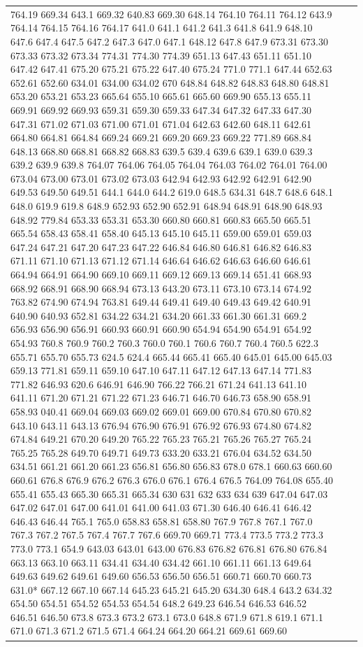 \documentclass[3p,super,numbers,sort&compress,preprint,10pt]{elsarticle}
\begin{document}
\begin{longtable}{|L{.1in}|L{.6in}||L{5.65in}|}
764.19 669.34 643.1 669.32 640.83 669.30 648.14 764.10 764.11 764.12 643.9 764.14 764.15 764.16 764.17 641.0 641.1 641.2 641.3 641.8 641.9 648.10 647.6 647.4 647.5 647.2 647.3 647.0 647.1 648.12 647.8 647.9 673.31 673.30 673.33 673.32 673.34 774.31 774.30 774.39 651.13 647.43 651.11 651.10 647.42 647.41 675.20 675.21 675.22 647.40 675.24 771.0 771.1 647.44 652.63 652.61 652.60 634.01 634.00 634.02 670 648.84 648.82 648.83 648.80 648.81 653.20 653.21 653.23 665.64 655.10 665.61 665.60 669.90 655.13 655.11 669.91 669.92 669.93 659.31 659.30 659.33 647.34 647.32 647.33 647.30 647.31 671.02 671.03 671.00 671.01 671.04 642.63 642.60 648.11 642.61 664.80 664.81 664.84 669.24 669.21 669.20 669.23 669.22 771.89 668.84 648.13 668.80 668.81 668.82 668.83 639.5 639.4 639.6 639.1 639.0 639.3 639.2 639.9 639.8 764.07 764.06 764.05 764.04 764.03 764.02 764.01 764.00 673.04 673.00 673.01 673.02 673.03 642.94 642.93 642.92 642.91 642.90 649.53 649.50 649.51 644.1 644.0 644.2 619.0 648.5 634.31 648.7 648.6 648.1 648.0 619.9 619.8 648.9 652.93 652.90 652.91 648.94 648.91 648.90 648.93 648.92 779.84 653.33 653.31 653.30 660.80 660.81 660.83 665.50 665.51 665.54 658.43 658.41 658.40 645.13 645.10 645.11 659.00 659.01 659.03 647.24 647.21 647.20 647.23 647.22 646.84 646.80 646.81 646.82 646.83 671.11 671.10 671.13 671.12 671.14 646.64 646.62 646.63 646.60 646.61 664.94 664.91 664.90 669.10 669.11 669.12 669.13 669.14 651.41 668.93 668.92 668.91 668.90 668.94 673.13 643.20 673.11 673.10 673.14 674.92 763.82 674.90 674.94 763.81 649.44 649.41 649.40 649.43 649.42 640.91 640.90 640.93 652.81 634.22 634.21 634.20 661.33 661.30 661.31 669.2 656.93 656.90 656.91 660.93 660.91 660.90 654.94 654.90 654.91 654.92 654.93 760.8 760.9 760.2 760.3 760.0 760.1 760.6 760.7 760.4 760.5 622.3 655.71 655.70 655.73 624.5 624.4 665.44 665.41 665.40 645.01 645.00 645.03 659.13 771.81 659.11 659.10 647.10 647.11 647.12 647.13 647.14 771.83 771.82 646.93 620.6 646.91 646.90 766.22 766.21 671.24 641.13 641.10 641.11 671.20 671.21 671.22 671.23 646.71 646.70 646.73 658.90 658.91 658.93 040.41 669.04 669.03 669.02 669.01 669.00 670.84 670.80 670.82 643.10 643.11 643.13 676.94 676.90 676.91 676.92 676.93 674.80 674.82 674.84 649.21 670.20 649.20 765.22 765.23 765.21 765.26 765.27 765.24 765.25 765.28 649.70 649.71 649.73 633.20 633.21 676.04 634.52 634.50 634.51 661.21 661.20 661.23 656.81 656.80 656.83 678.0 678.1 660.63 660.60 660.61 676.8 676.9 676.2 676.3 676.0 676.1 676.4 676.5 764.09 764.08 655.40 655.41 655.43 665.30 665.31 665.34 630 631 632 633 634 639 647.04 647.03 647.02 647.01 647.00 641.01 641.00 641.03 671.30 646.40 646.41 646.42 646.43 646.44 765.1 765.0 658.83 658.81 658.80 767.9 767.8 767.1 767.0 767.3 767.2 767.5 767.4 767.7 767.6 669.70 669.71 773.4 773.5 773.2 773.3 773.0 773.1 654.9 643.03 643.01 643.00 676.83 676.82 676.81 676.80 676.84 663.13 663.10 663.11 634.41 634.40 634.42 661.10 661.11 661.13 649.64 649.63 649.62 649.61 649.60 656.53 656.50 656.51 660.71 660.70 660.73 631.0* 667.12 667.10 667.14 645.23 645.21 645.20 634.30 648.4 643.2 634.32 654.50 654.51 654.52 654.53 654.54 648.2 649.23 646.54 646.53 646.52 646.51 646.50 673.8 673.3 673.2 673.1 673.0 648.8 671.9 671.8 619.1 671.1 671.0 671.3 671.2 671.5 671.4 664.24 664.20 664.21 669.61 669.60 
\end{longtable}
\end{document}
